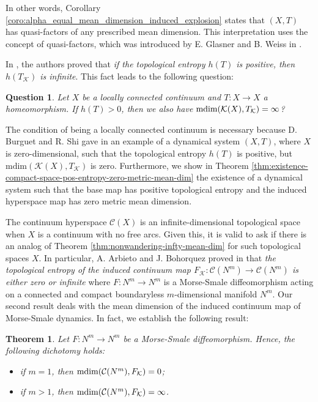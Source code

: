 \documentclass[sn-mathphys-num]{sn-jnl}%
\theoremstyle{thmstyleone}%
\newtheorem{theorem}{Theorem}%
\newtheorem*{question*}{Question}
\theoremstyle{thmstyletwo}%
\theoremstyle{thmstylethree}%
\newcommand*\induce[1]{#1_\mathcal{K}}
\newcommand*\hyp[1]{\mathcal{#1}}
\begin{document}
In other words, Corollary \ref{coro:alpha_equal_mean_dimension_induced_explosion} states that $(X, T)$ has quasi-factors of any prescribed mean dimension. This interpretation uses the concept of quasi-factors, which was introduced by E. Glasner and B. Weiss in \cite{glasner_weiss_1995}.

In \cite[Proposition 6]{bauer_sigmund_1975}, the authors proved that \textit{if the topological entropy $h(T)$ is positive, then $h(\induce{T})$ is infinite}. This fact leads to the following question:\\  

\begin{question*}
    Let $X$ be a locally connected continuum and $T: X \to X$ a homeomorphism. If $h(T) > 0$, then we also have $\normalfont{\text{mdim}}(\hyp{K}(X),\induce{T}) = \infty$?\\
\end{question*}

The condition of being a locally connected continuum is necessary because D. Burguet and R. Shi gave in \cite{burguet_shi_2022} an example of a dynamical system $(X, T)$, where $X$ is zero-dimensional, such that the topological entropy $h(T)$ is positive, but $\text{mdim}(\hyp{K}(X), \induce{T})$ is zero. Furthermore, we show in Theorem \ref{thm:existence-compact-space-pos-entropy-zero-metric-mean-dim} the existence of a dynamical system such that the base map has positive topological entropy and the induced hyperspace map has zero metric mean dimension.

The continuum hyperspace $\hyp{C}(X)$ is an infinite-dimensional topological space when $X$ is a continuum with no free arcs. Given this, it is valid to ask if there is an analog of Theorem \ref{thm:nonwandering-infty-mean-dim} for such topological spaces $X$. In particular, A. Arbieto and J. Bohorquez proved in \cite[Theorem B]{arbieto_bohorquez_2023} that \textit{the topological entropy of the induced continuum map $\induce{F}: \hyp{C}(N^m) \to \hyp{C}(N^m)$ is either zero or infinite} where $F: N^m \to N^m$ is a Morse-Smale diffeomorphism acting on a connected and compact boundaryless $m$-dimensional manifold $N^m$. Our second result deals with the mean dimension of the induced continuum map of Morse-Smale dynamics. In fact, we establish the following result:\\

\begin{theorem}\label{thm:continuum-hyp-morse-smale}
    Let $F: N^m \to N^m$ be a Morse-Smale diffeomorphism. Hence, the following dichotomy holds:
    \begin{itemize}
        \item if $m = 1$, then $\normalfont{\text{mdim}}(\hyp{C}(N^m), \induce{F}) = 0$;
        \item if $m > 1$, then $\normalfont{\text{mdim}}(\hyp{C}(N^m), \induce{F}) = \infty$.
    \end{itemize}
\end{theorem}
\end{document}
